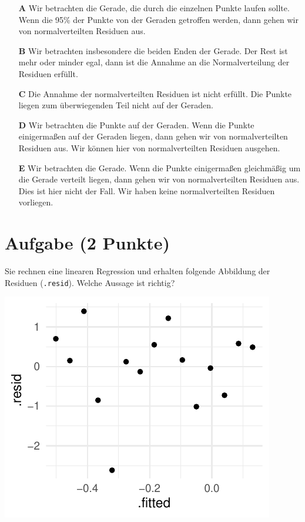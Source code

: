 \documentclass[a4paper, 9pt]{scrartcl}\usepackage[]{graphicx}\usepackage[]{xcolor}
\makeatletter
\def\maxwidth{ %
  \ifdim\Gin@nat@width>\linewidth
    \linewidth
  \else
    \Gin@nat@width
  \fi
}
\makeatother
\begin{document}
\begin{enumerate}
\item [\textbf{A} \msquare] Wir betrachten die Gerade, die durch die einzelnen Punkte laufen sollte. Wenn die 95\% der Punkte von der Geraden getroffen werden, dann gehen wir von normalverteilten Residuen aus.
\item [\textbf{B} \msquare] Wir betrachten insbesondere die beiden Enden der Gerade. Der Rest ist mehr oder minder egal, dann ist die Annahme an die Normalverteilung der Residuen erfüllt.
\item [\textbf{C} \msquare] Die Annahme der normalverteilten Residuen ist nicht erfüllt. Die Punkte liegen zum überwiegenden Teil nicht auf der Geraden.
\item [\textbf{D} \msquare] Wir betrachten die Punkte auf der Geraden. Wenn die Punkte einigermaßen auf der Geraden liegen, dann gehen wir von normalverteilten Residuen aus. Wir können hier von normalverteilten Residuen ausgehen.
\item [\textbf{E} \msquare] Wir betrachten die Gerade. Wenn die Punkte einigermaßen gleichmäßig um die Gerade verteilt liegen, dann gehen wir von normalverteilten Residuen aus. Dies ist hier nicht der Fall. Wir haben keine normalverteilten Residuen vorliegen.
\end{enumerate}

\section{Aufgabe \hfill (2 Punkte)}



Sie rechnen eine linearen Regression und erhalten folgende Abbildung der Residuen (\texttt{.resid}). Welche Aussage ist richtig?



{\centering \includegraphics[width=\maxwidth]{img/mc-regression-06-a-1} 

}
\end{document}
